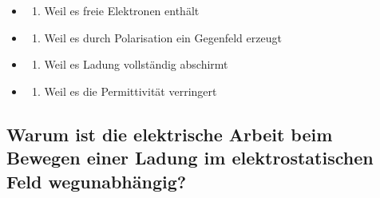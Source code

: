 \documentclass[
  11pt,
]{article}
\providecommand{\tightlist}{%
  \setlength{\itemsep}{0pt}\setlength{\parskip}{0pt}}
\begin{document}
\begin{itemize}
\tightlist
\item
  \begin{enumerate}
  \def\labelenumi{\Alph{enumi})}
  \tightlist
  \item
    Weil es freie Elektronen enthält\\
  \end{enumerate}
\item
  \begin{enumerate}
  \def\labelenumi{\Alph{enumi})}
  \setcounter{enumi}{1}
  \tightlist
  \item
    Weil es durch Polarisation ein Gegenfeld erzeugt\\
  \end{enumerate}
\item
  \begin{enumerate}
  \def\labelenumi{\Alph{enumi})}
  \setcounter{enumi}{2}
  \tightlist
  \item
    Weil es Ladung vollständig abschirmt\\
  \end{enumerate}
\item
  \begin{enumerate}
  \def\labelenumi{\Alph{enumi})}
  \setcounter{enumi}{3}
  \tightlist
  \item
    Weil es die Permittivität verringert
  \end{enumerate}
\end{itemize}

\subsection{Warum ist die elektrische Arbeit beim Bewegen einer Ladung
im elektrostatischen Feld
wegunabhängig?}\label{warum-ist-die-elektrische-arbeit-beim-bewegen-einer-ladung-im-elektrostatischen-feld-wegunabhuxe4ngig}
\end{document}
